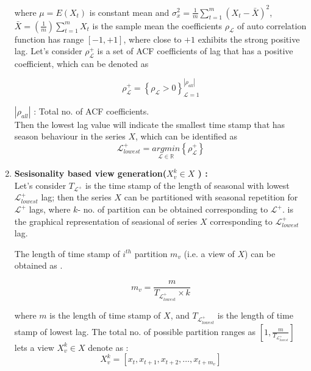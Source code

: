 \documentclass[a4paper, fleqn]{cas-sc}
\theoremstyle{definition}
\theoremstyle{remark}
\begin{document}
\begin{enumerate}[label=(\alph*)]
where $\mu=E(X_t)$ is constant mean and $\sigma_x^2 = \frac{1}{m} \sum_{t=1}^{m} (X_t - \bar{X} )^2$,  $\bar{X}= \left(\frac{1}{m} \right) \sum_{t=1}^{m} X_t$ is the sample mean the coefficients $\rho_\mathscr{L}$ of auto correlation function has range $[-1,  +1]$,  where close to $+1$ exhibits the strong positive lag. Let's consider $\rho_\mathscr{L}^+$ is a set of ACF coefficients of lag that has a positive coefficient,  which can be denoted as

\begin{equation}\label{rhl}
  \rho_\mathscr{L}^+ ={\left\{ \rho_\mathscr{L} > 0 \right\}}_{\mathscr{L}=1}^{\left| \rho_{all}  \right|}
\end{equation} 

$\left|\rho_{all}  \right|$ :  Total no. of ACF coefficients.\\


Then the lowest lag value will indicate the smallest time stamp that has season behaviour in the series $X$, which can be identified as
\begin{equation} \label{lxl}
  \mathscr{L}_{lowest}^+ = \underset{\mathscr{L} \in \mathbb{R}}{arg min} \left\{\rho_{\mathscr{L}}^+  \right\}
\end{equation}



\item \textbf{Sesisonality based view generation($X_v^k \in X$ ) : } \\
Let's consider $T_{\mathscr{L} ^+}$ is the time stamp of the length of seasonal with lowest $\mathscr{L}_{lowest}^+$ lag; then the series $X$ can be partitioned with seasonal repetition for $\mathscr{L}^+$ lags,  where $k$- no. of partition can be obtained corresponding to $\mathscr{L}^+$.  is the graphical representation of seasional of series $X$ corresponding to $\mathscr{L}_{lowest}^+$ lag.

The length of time stamp of $i^{th}$ partition $m_v$ (i.e. a view of $X$) can be obtained as .

\begin{equation} \label{vvtk}
  m_v=\frac{m}{T_{ \mathscr{L}_{lowest}^+ }\times k}
\end{equation}

where $m$ is the length of time stamp of $X$,  and $T_{ \mathscr{L}_{lowest}^+ }$ is the length of time stamp of lowest lag.
The total no. of possible partition ranges as $\left[1,  \frac{m}{T_{\mathscr{L}_{lowest}^+ }} \right]$
lets a view $X_v^k \in X$ denote as : 
\begin{equation} \label{vi g}
  X_v^k = [x_t, x_{t+1}, x_{t+2},  \dots , x_{t+m_v}]
\end{equation}


\end{enumerate}
\end{document}
